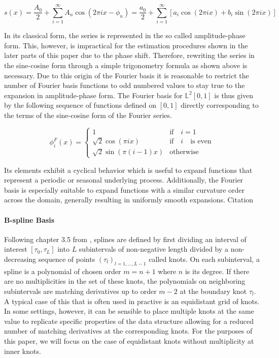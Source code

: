 \documentclass[11pt,twoside,a4paper]{article}
\begin{document}
	\begin{equation}\label{Fourier_Series}
		s(x) = \frac{A_0}{2} + \sum_{i = 1}^{\infty} A_n \cos(2\pi i x - \phi_n) = \frac{a_0}{2} + \sum_{i = 1}^{\infty}\left[a_i \cos(2\pi i x) + b_i \sin(2\pi i x)\right]
	\end{equation}
	
	In its classical form, the series is represented in the so called amplitude-phase form. This, however, is impractical for the estimation procedures shown in the later parts of this paper due to the phase shift. Therefore, rewriting the series in the sine-cosine form through a simple trigonometry formula as shown above is necessary. Due to this origin of the Fourier basis it is reasonable to restrict the number of Fourier basis functions to odd numbered values to stay true to the expansion in amplitude-phase form.
	The Fourier basis for $\mathbb{L}^2[0,1]$ is thus given by the following sequence of functions defined on $[0,1]$ directly corresponding to the terms of the sine-cosine form of the Fourier series.
	
	\begin{equation}
		\phi_{i}^{F}(x) = 
		\begin{cases}
			1 & \text{if} \quad i = 1\\
			\sqrt{2} \cos(\pi i x) & \text{if} \quad i \quad \text{is even} \\
			\sqrt{2} \sin(\pi (i-1)x) & \text{otherwise}
		\end{cases}
	\end{equation}

	Its elements exhibit a cyclical behavior which is useful to expand functions that represent a periodic or seasonal underlying process. Additionally, the Fourier basis is especially suitable to expand functions with a similar curvature order across the domain, generally resulting in uniformly smooth expansions. {\color{red} Citation}

	\paragraph{B-spline Basis} Following chapter 3.5 from \cite{ramsay_functional_2005}, splines are defined by first dividing an interval of interest $[\tau_0, \tau_L]$ into $L$ subintervals of non-negative length divided by a non-decreasing sequence of points $(\tau_l)_{l = 1,\dots, L-1}$ called knots. On each subinterval, a spline is a polynomial of chosen order $m = n+1$ where $n$ is its degree. If there are no multiplicities in the set of these knots, the polynomials on neighboring subintervals are matching derivatives up to order $m-2$ at the boundary knot $\tau_l$. A typical case of this that is often used in practive is an equidistant grid of knots. In some settings, however, it can be sensible to place multiple knots at the same value to replicate specific properties of the data structure allowing for a reduced number of matching derivatives at the corresponding knots. For the purposes of this paper, we will focus on the case of equidistant knots without multiplicity at inner knots.\\
	
\end{document}
